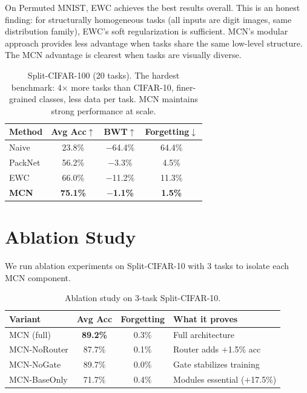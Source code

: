 \documentclass[10pt,twocolumn]{article}
\begin{document}
On Permuted MNIST, EWC achieves the best results overall. This is an honest finding: for structurally homogeneous tasks (all inputs are digit images, same distribution family), EWC's soft regularization is sufficient. MCN's modular approach provides less advantage when tasks share the same low-level structure. The MCN advantage is clearest when tasks are visually diverse.

\begin{table}[h]
\centering
\caption{Split-CIFAR-100 (20 tasks). The hardest benchmark: 4$\times$ more tasks than CIFAR-10, finer-grained classes, less data per task. MCN maintains strong performance at scale.}
\label{tab:cifar100}
\small
\begin{tabular}{lccc}
\toprule
Method & Avg Acc$\uparrow$ & BWT$\uparrow$ & Forgetting$\downarrow$ \\
\midrule
Naive         & 23.8\%  & $-$64.4\%  & 64.4\% \\
PackNet       & 56.2\%  & $-$3.3\%   & 4.5\%  \\
EWC           & 66.0\%  & $-$11.2\%  & 11.3\% \\
\textbf{MCN}  & \textbf{75.1\%} & \textbf{$-$1.1\%} & \textbf{1.5\%} \\
\bottomrule
\end{tabular}
\end{table}

\section{Ablation Study}

We run ablation experiments on Split-CIFAR-10 with 3 tasks to isolate each MCN component.

\begin{table}[h]
\centering
\caption{Ablation study on 3-task Split-CIFAR-10.}
\label{tab:ablation}
\small
\begin{tabular}{lccp{3.5cm}}
\toprule
Variant & Avg Acc & Forgetting & What it proves \\
\midrule
MCN (full)     & \textbf{89.2\%} & 0.3\% & Full architecture \\
MCN-NoRouter   & 87.7\% & 0.1\% & Router adds $+$1.5\% acc \\
MCN-NoGate     & 89.7\% & 0.0\% & Gate stabilizes training \\
MCN-BaseOnly   & 71.7\% & 0.4\% & Modules essential ($+$17.5\%) \\
\bottomrule
\end{tabular}
\end{table}
\end{document}
